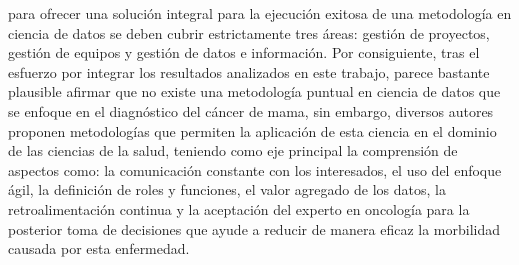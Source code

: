 para ofrecer una solución integral para la ejecución exitosa de una metodología en ciencia de datos se deben cubrir estrictamente tres áreas: gestión de proyectos, gestión de equipos y gestión de datos e información. 
Por consiguiente, tras el esfuerzo por integrar los resultados analizados en este trabajo, parece bastante plausible afirmar que no existe una metodología puntual en ciencia de datos que se enfoque en el diagnóstico del cáncer de mama, sin embargo, diversos autores proponen metodologías que permiten la aplicación de esta ciencia en el dominio de las ciencias de la salud, teniendo como eje principal la comprensión de aspectos como: la comunicación constante con los interesados, el uso del enfoque ágil, la definición de roles y funciones, el valor agregado de los datos, la retroalimentación continua y la aceptación del experto en oncología para la posterior toma de decisiones que ayude a reducir de manera eficaz la morbilidad causada por esta enfermedad.
